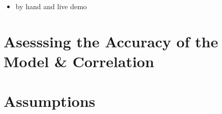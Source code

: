 \documentclass[]{article}
\providecommand{\tightlist}{%
  \setlength{\itemsep}{0pt}\setlength{\parskip}{0pt}}
\begin{document}
\begin{itemize}
\tightlist
\item
  by hand and live demo
\end{itemize}

\hypertarget{asesssing-the-accuracy-of-the-model-correlation}{%
\section{Asesssing the Accuracy of the Model \&
Correlation}\label{asesssing-the-accuracy-of-the-model-correlation}}

\hypertarget{assumptions}{%
\section{Assumptions}\label{assumptions}}
\end{document}
